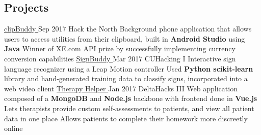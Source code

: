 \documentclass[]{aanguyen_res}
\begin{document}
\begin{main}
		\section{Projects}
			\vspace{0.1cm}%
			\mainentry%
				{\href{https://github.com/kumailn/clipBuddy}{clipBuddy {\faGithub}}}%
				{Sep 2017}%
				{Hack the North}%
				{}%
				{\faCaretRight Background phone application that allows users to access utilities from their clipboard, built in \textbf{Android Studio} using \textbf{Java}
				\faCaretRight Winner of XE.com API prize by successfully implementing currency conversion capabilities}
			\vspace{0.1cm}%
			\mainentry%
				{\href{https://github.com/aanguyen/SignBuddy}{SignBuddy {\faGithub}}}%
				{Mar 2017}%
				{CUHacking I}%
				{}%
				{\faCaretRight Interactive sign language recognizer using a Leap Motion controller 
				\faCaretRight Used \textbf{Python scikit-learn} library and hand-generated training data to classify signs, incorporated into a web video client}
			\vspace{0.1cm}%
			\mainentry%
				{\href{https://github.com/dtong1113/TherapyHelper}{Therapy Helper {\faGithub}}}%
				{Jan 2017}%
				{DeltaHacks III}%
				{}%
				{\faCaretRight Web application composed of a \textbf{MongoDB} and \textbf{Node.js} backbone with frontend done in \textbf{Vue.js}
				\faCaretRight Lets therapists provide custom self-assessments to patients, and view all patient data in one place
				\faCaretRight Allows patients to complete their homework more discreetly online}

\end{main}
\end{document}
